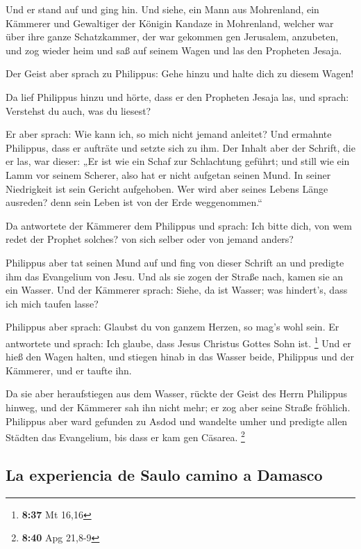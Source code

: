  Und er stand auf und ging hin. Und siehe, ein Mann aus
Mohrenland, ein Kämmerer und Gewaltiger der Königin Kandaze in
Mohrenland, welcher war über ihre ganze Schatzkammer, der war gekommen
gen Jerusalem, anzubeten,  und zog wieder heim und saß
auf seinem Wagen und las den Propheten Jesaja.

 Der Geist aber sprach zu Philippus: Gehe hinzu und halte
dich zu diesem Wagen!

 Da lief Philippus hinzu und hörte, dass er den Propheten
Jesaja las, und sprach: Verstehst du auch, was du liesest?

 Er aber sprach: Wie kann ich, so mich nicht jemand
anleitet? Und ermahnte Philippus, dass er aufträte und setzte sich zu
ihm.  Der Inhalt aber der Schrift, die er las, war
dieser: „Er ist wie ein Schaf zur Schlachtung geführt; und still wie ein
Lamm vor seinem Scherer, also hat er nicht aufgetan seinen Mund.
 In seiner Niedrigkeit ist sein Gericht aufgehoben. Wer
wird aber seines Lebens Länge ausreden? denn sein Leben ist von der Erde
weggenommen.``

 Da antwortete der Kämmerer dem Philippus und sprach: Ich
bitte dich, von wem redet der Prophet solches? von sich selber oder von
jemand anders?

 Philippus aber tat seinen Mund auf und fing von dieser
Schrift an und predigte ihm das Evangelium von Jesu.  Und
als sie zogen der Straße nach, kamen sie an ein Wasser. Und der Kämmerer
sprach: Siehe, da ist Wasser; was hindert's, dass ich mich taufen lasse?

 Philippus aber sprach: Glaubst du von ganzem Herzen, so
mag's wohl sein. Er antwortete und sprach: Ich glaube, dass Jesus
Christus Gottes Sohn ist. \footnote{\textbf{8:37} Mt 16,16}
 Und er hieß den Wagen halten, und stiegen hinab in das
Wasser beide, Philippus und der Kämmerer, und er taufte ihn.

 Da sie aber heraufstiegen aus dem Wasser, rückte der
Geist des Herrn Philippus hinweg, und der Kämmerer sah ihn nicht mehr;
er zog aber seine Straße fröhlich.  Philippus aber ward
gefunden zu Asdod und wandelte umher und predigte allen Städten das
Evangelium, bis dass er kam gen Cäsarea. \footnote{\textbf{8:40} Apg
  21,8-9}

\hypertarget{la-experiencia-de-saulo-camino-a-damasco}{%
\subsection{La experiencia de Saulo camino a
Damasco}\label{la-experiencia-de-saulo-camino-a-damasco}}

